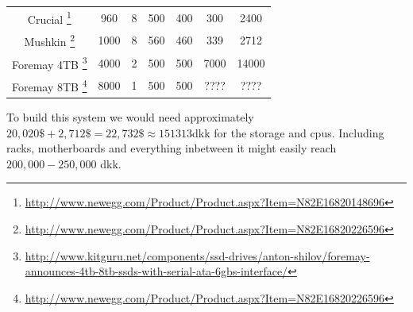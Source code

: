 \begin{table}[H]
\begin{tabular}{|ccccccc}
\multicolumn{1}{|c|}{Crucial \footnote{\url{http://www.newegg.com/Product/Product.aspx?Item=N82E16820148696}} }          & 960                          & 8                           & 500                       & 400                             & 300                        & 2400                                          \\
\multicolumn{1}{|c|}{Mushkin \footnote{\url{http://www.newegg.com/Product/Product.aspx?Item=N82E16820226596}}  } & 1000                         & 8                            & 560                       & 460                             & 339                        & 2712                                          \\
\multicolumn{1}{|c|}{Foremay 4TB \footnote{\url{http://www.kitguru.net/components/ssd-drives/anton-shilov/foremay-announces-4tb-8tb-ssds-with-serial-ata-6gbs-interface/}}  } & 4000                         & 2                            & 500                       & 500                            & 7000                        & 14000                                          \\
\multicolumn{1}{|c|}{Foremay 8TB \footnote{\url{http://www.newegg.com/Product/Product.aspx?Item=N82E16820226596}}  } & 8000                         & 1                            & 500                       & 500                             & ????                        &????                                          \\ \cline{1-1}

\end{tabular}
\end{table}
To build this system we would need approximately $20,020\$+2,712\$=22,732\$ \approx 151313 $dkk for the storage and cpus.
Including racks, motherboards and everything inbetween it might easily reach $200,000-250,000$ dkk.


